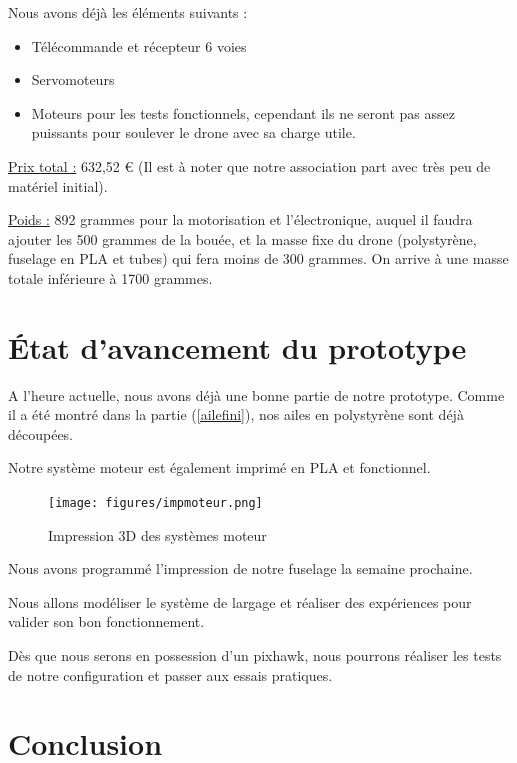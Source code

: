 \documentclass[a4paper,12pt,french]{report}
\begin{document}
Nous avons déjà les éléments suivants :
\begin{itemize}
    \item Télécommande et récepteur 6 voies
    \item Servomoteurs
    \item Moteurs pour les tests fonctionnels, cependant ils ne seront pas assez puissants pour soulever le drone avec sa charge utile.\newline
\end{itemize}

\underline{Prix total :} 632,52 € (Il est à noter que notre association part avec très peu de matériel initial).

\underline{Poids :} 892 grammes pour la motorisation et l’électronique, auquel il faudra ajouter les 500 grammes de la bouée, et la masse fixe du drone (polystyrène, fuselage en PLA et tubes) qui fera moins de 300 grammes. On arrive à une masse totale inférieure à 1700 grammes.

\chapter{État d'avancement du prototype}

A l'heure actuelle, nous avons déjà une bonne partie de notre prototype. Comme il a été montré dans la partie (\ref{ailefini}), nos ailes en polystyrène sont déjà découpées.\newline

Notre système moteur est également imprimé en PLA et fonctionnel.

\begin{figure}[h]
    \centering
    \texttt{[image: figures/impmoteur.png]}
    \caption{Impression 3D des systèmes moteur}
\end{figure}

Nous avons programmé l'impression de notre fuselage la semaine prochaine.\newline

Nous allons modéliser le système de largage et réaliser des expériences pour valider son bon fonctionnement.\newline

Dès que nous serons en possession d'un pixhawk, nous pourrons réaliser les tests de notre configuration et passer aux essais pratiques.

\chapter*{Conclusion}
\end{document}
